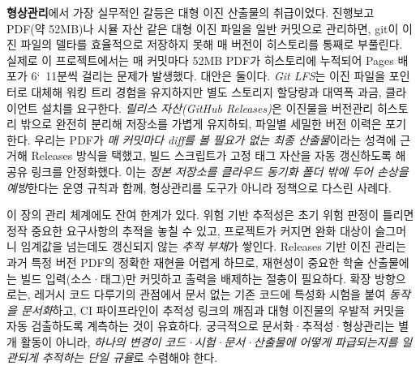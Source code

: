 \textbf{형상관리}에서 가장 실무적인 갈등은 대형 이진 산출물의 취급이었다. 진행보고 PDF(약 52MB)나 시뮬 자산 같은 대형 이진 파일을 일반 커밋으로 관리하면, git이 이진 파일의 델타를 효율적으로 저장하지 못해 매 버전이 히스토리를 통째로 부풀린다\cite{chacon2014progit}. 실제로 이 프로젝트에서는 매 커밋마다 52MB PDF가 히스토리에 누적되어 Pages 배포가 6\char`~11분씩 걸리는 문제가 발생했다. 대안은 둘이다. \emph{Git LFS}는 이진 파일을 포인터로 대체해 워킹 트리 경험을 유지하지만 별도 스토리지 할당량과 대역폭 과금, 클라이언트 설치를 요구한다. \emph{릴리스 자산(GitHub Releases)}은 이진물을 버전관리 히스토리 밖으로 완전히 분리해 저장소를 가볍게 유지하되, 파일별 세밀한 버전 이력은 포기한다. 우리는 PDF가 \emph{매 커밋마다 diff를 볼 필요가 없는 최종 산출물}이라는 성격에 근거해 Releases 방식을 택했고, 빌드 스크립트가 고정 태그 자산을 자동 갱신하도록 해 공유 링크를 안정화했다\cite{ares-repo}. 이는 \emph{정본 저장소를 클라우드 동기화 폴더 밖에 두어 손상을 예방}한다는 운영 규칙과 함께, 형상관리를 도구가 아니라 정책으로 다스린 사례다.

이 장의 관리 체계에도 잔여 한계가 있다. 위험 기반 추적성은 초기 위험 판정이 틀리면 정작 중요한 요구사항의 추적을 놓칠 수 있고, 프로젝트가 커지면 완화 대상이 슬그머니 임계값을 넘는데도 갱신되지 않는 \emph{추적 부채}가 쌓인다. Releases 기반 이진 관리는 과거 특정 버전 PDF의 정확한 재현을 어렵게 하므로, 재현성이 중요한 학술 산출물에는 빌드 입력(소스·태그)만 커밋하고 출력을 배제하는 절충이 필요하다. 확장 방향으로는, 레거시 코드 다루기\cite{feathers2004legacy}의 관점에서 문서 없는 기존 코드에 특성화 시험을 붙여 \emph{동작을 문서화}하고, CI 파이프라인이 추적성 링크의 깨짐과 대형 이진물의 우발적 커밋을 자동 검출하도록 계측하는 것이 유효하다. 궁극적으로 문서화·추적성·형상관리는 별개 활동이 아니라, \emph{하나의 변경이 코드·시험·문서·산출물에 어떻게 파급되는지를 일관되게 추적하는 단일 규율}\cite{iso29119}로 수렴해야 한다.

